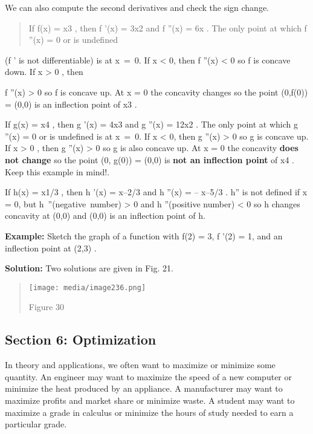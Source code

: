 We can also compute the second derivatives and check the sign change.

\begin{quote}
If f(x) = x3 , then f '(x) = 3x2 and f ''(x) = 6x . The only point at
which f ''(x) = 0 or is undefined
\end{quote}

(f ' is not differentiable) is at x~=~0. If x \textless{} 0, then f
''(x) \textless{} 0 so f is concave down. If x \textgreater{} 0 , then

f ''(x) \textgreater{} 0 so f is concave up. At x = 0 the concavity
changes so the point (0,f(0)) = (0,0) is an inflection point of x3 .

If g(x) = x4 , then g '(x) = 4x3 and g ''(x) = 12x2 . The only point at
which g ''(x) = 0 or is undefined is at x~=~0. If x \textless{} 0, then
g ''(x) \textgreater{} 0 so g is concave up. If x \textgreater{} 0 ,
then g ''(x) \textgreater{} 0 so g is also concave up. At x = 0 the
concavity \textbf{does not change} so the point (0, g(0)) = (0,0) is
\textbf{not an inflection point} of x4 . Keep this example in mind!.

If h(x) = x1/3 , then h '(x) = x--2/3 and h ''(x) = -- x--5/3 . h'' is
not defined if x = 0, but h~''(negative~number) \textgreater{} 0 and h
''(positive number) \textless{} 0 so h changes concavity at (0,0) and
(0,0) is an inflection point of h.

\textbf{Example:} Sketch the graph of a function with f(2) = 3, f '(2) =
1, and an inflection point at (2,3) .

\textbf{Solution:} Two solutions are given in Fig. 21.

\begin{quote}
\texttt{[image: media/image236.png]}

Figure 30
\end{quote}

\hypertarget{section-6-optimization}{\subsection{Section 6:
Optimization}\label{section-6-optimization}}

In theory and applications, we often want to maximize or minimize some
quantity. An engineer may want to maximize the speed of a new computer
or minimize the heat produced by an appliance. A manufacturer may want
to maximize profits and market share or minimize waste. A student may
want to maximize a grade in calculus or minimize the hours of study
needed to earn a particular grade.

